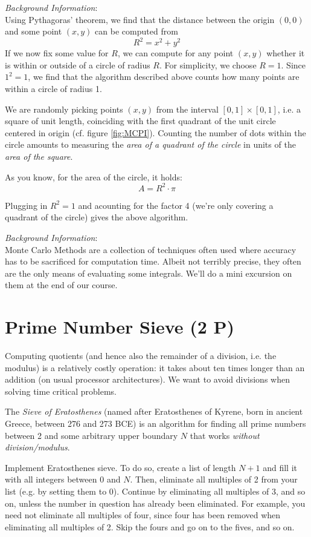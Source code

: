 \documentclass[
	english,
	fontsize=10pt,
	parskip=half,
	titlepage=true,
	DIV=12
]{scrartcl}
\newcommand*{\ie}{i.\;e. }
\newcommand*{\eg}{e.\;g. }
\begin{document}
\emph{Background Information}:\\
Using Pythagoras' theorem, we find that the distance between the origin $(0, 0)$ and some point $(x, y)$ can be computed from
\[ R^2 = x^2 + y^2 \]
If we now fix some value for $R$, we can compute for any point $(x, y)$ whether it is within or outside of a circle of radius $R$. For simplicity, we choose $R = 1$. Since $1^2 = 1$, we find that the algorithm described above counts how many points are within a circle of radius 1.

We are randomly picking points $(x, y)$ from the interval $[0, 1] \times [0, 1]$, \ie a square of unit length, coinciding with the first quadrant of the unit circle centered in origin (cf. figure \ref{fig:MCPI}). Counting the number of dots within the circle amounts to measuring the \emph{area of a quadrant of the circle} in units of the \emph{area of the square}.

As you know, for the area of the circle, it holds:
\[ A = R^2 \cdot \pi \]

Plugging in $R^2 = 1$ and acounting for the factor 4 (we're only covering a quadrant of the circle) gives the above algorithm.

\emph{Background Information}:\\
Monte Carlo Methods are a collection of techniques often used where accuracy has to be sacrificed for computation time. Albeit not terribly precise, they often are the only means of evaluating some integrals. We'll do a mini excursion on them at the end of our course.


\section{Prime Number Sieve (2 P)}
Computing quotients (and hence also the remainder of a division, \ie the modulus) is a relatively costly operation: it takes about ten times longer than an addition (on usual processor architectures). We want to avoid divisions when solving time critical problems.

The \emph{Sieve of Eratosthenes} (named after Eratosthenes of Kyrene, born in ancient Greece, between 276 and 273 BCE) is an algorithm for finding all prime numbers between 2 and some arbitrary upper boundary $N$ that works \emph{without division/modulus}.

Implement Eratosthenes sieve. To do so, create a list of length $N+1$ and fill it with all integers between $0$ and $N$. Then, eliminate all multiples of 2 from your list (\eg by setting them to 0). Continue by eliminating all multiples of 3, and so on, unless the number in question has already been eliminated. For example, you need not eliminate all multiples of four, since four has been removed when eliminating all multiples of 2. Skip the fours and go on to the fives, and so on.
\end{document}
